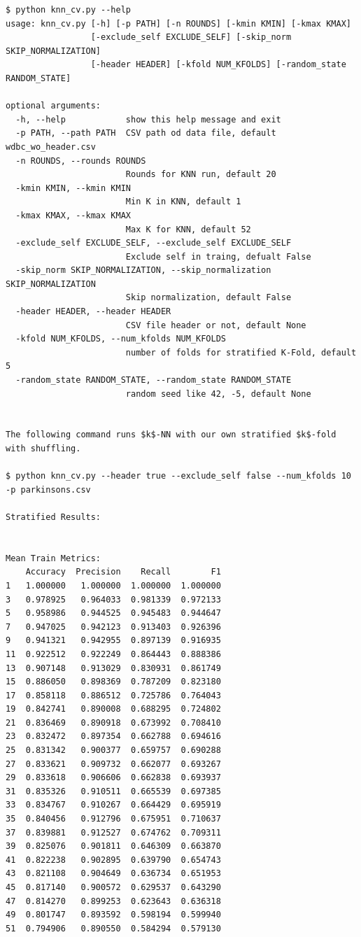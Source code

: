 \begin{verbatim}
$ python knn_cv.py --help
usage: knn_cv.py [-h] [-p PATH] [-n ROUNDS] [-kmin KMIN] [-kmax KMAX]
                 [-exclude_self EXCLUDE_SELF] [-skip_norm SKIP_NORMALIZATION]
                 [-header HEADER] [-kfold NUM_KFOLDS] [-random_state RANDOM_STATE]

optional arguments:
  -h, --help            show this help message and exit
  -p PATH, --path PATH  CSV path od data file, default wdbc_wo_header.csv
  -n ROUNDS, --rounds ROUNDS
                        Rounds for KNN run, default 20
  -kmin KMIN, --kmin KMIN
                        Min K in KNN, default 1
  -kmax KMAX, --kmax KMAX
                        Max K for KNN, default 52
  -exclude_self EXCLUDE_SELF, --exclude_self EXCLUDE_SELF
                        Exclude self in traing, defualt False
  -skip_norm SKIP_NORMALIZATION, --skip_normalization SKIP_NORMALIZATION
                        Skip normalization, default False
  -header HEADER, --header HEADER
                        CSV file header or not, default None
  -kfold NUM_KFOLDS, --num_kfolds NUM_KFOLDS
                        number of folds for stratified K-Fold, default 5
  -random_state RANDOM_STATE, --random_state RANDOM_STATE
                        random seed like 42, -5, default None


The following command runs $k$-NN with our own stratified $k$-fold with shuffling.  

$ python knn_cv.py --header true --exclude_self false --num_kfolds 10 -p parkinsons.csv

Stratified Results:


Mean Train Metrics: 
    Accuracy  Precision    Recall        F1
1   1.000000   1.000000  1.000000  1.000000
3   0.978925   0.964033  0.981339  0.972133
5   0.958986   0.944525  0.945483  0.944647
7   0.947025   0.942123  0.913403  0.926396
9   0.941321   0.942955  0.897139  0.916935
11  0.922512   0.922249  0.864443  0.888386
13  0.907148   0.913029  0.830931  0.861749
15  0.886050   0.898369  0.787209  0.823180
17  0.858118   0.886512  0.725786  0.764043
19  0.842741   0.890008  0.688295  0.724802
21  0.836469   0.890918  0.673992  0.708410
23  0.832472   0.897354  0.662788  0.694616
25  0.831342   0.900377  0.659757  0.690288
27  0.833621   0.909732  0.662077  0.693267
29  0.833618   0.906606  0.662838  0.693937
31  0.835326   0.910511  0.665539  0.697385
33  0.834767   0.910267  0.664429  0.695919
35  0.840456   0.912796  0.675951  0.710637
37  0.839881   0.912527  0.674762  0.709311
39  0.825076   0.901811  0.646309  0.663870
41  0.822238   0.902895  0.639790  0.654743
43  0.821108   0.904649  0.636734  0.651953
45  0.817140   0.900572  0.629537  0.643290
47  0.814270   0.899253  0.623643  0.636318
49  0.801747   0.893592  0.598194  0.599940
51  0.794906   0.890550  0.584294  0.579130


\end{verbatim}
